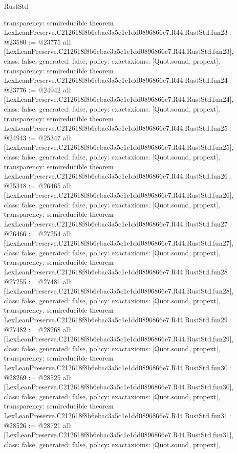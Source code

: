 \begin{lexlean}{RustStd}
\begin{coremodule}
{  transparency: semireducible
}
theorem LexLeanPreserve.C212618f8b6ebac3a5c1e1dd0896866e7.R44.RustStd.fun23 : @23580 := @23775 {
  all: [LexLeanPreserve.C212618f8b6ebac3a5c1e1dd0896866e7.R44.RustStd.fun23],
  class: false,
  generated: false,
  policy: exact{axioms: [Quot.sound, propext]},
  transparency: semireducible
}
theorem LexLeanPreserve.C212618f8b6ebac3a5c1e1dd0896866e7.R44.RustStd.fun24 : @23776 := @24942 {
  all: [LexLeanPreserve.C212618f8b6ebac3a5c1e1dd0896866e7.R44.RustStd.fun24],
  class: false,
  generated: false,
  policy: exact{axioms: [Quot.sound, propext]},
  transparency: semireducible
}
theorem LexLeanPreserve.C212618f8b6ebac3a5c1e1dd0896866e7.R44.RustStd.fun25 : @24943 := @25347 {
  all: [LexLeanPreserve.C212618f8b6ebac3a5c1e1dd0896866e7.R44.RustStd.fun25],
  class: false,
  generated: false,
  policy: exact{axioms: [Quot.sound, propext]},
  transparency: semireducible
}
theorem LexLeanPreserve.C212618f8b6ebac3a5c1e1dd0896866e7.R44.RustStd.fun26 : @25348 := @26465 {
  all: [LexLeanPreserve.C212618f8b6ebac3a5c1e1dd0896866e7.R44.RustStd.fun26],
  class: false,
  generated: false,
  policy: exact{axioms: [Quot.sound, propext]},
  transparency: semireducible
}
theorem LexLeanPreserve.C212618f8b6ebac3a5c1e1dd0896866e7.R44.RustStd.fun27 : @26466 := @27254 {
  all: [LexLeanPreserve.C212618f8b6ebac3a5c1e1dd0896866e7.R44.RustStd.fun27],
  class: false,
  generated: false,
  policy: exact{axioms: [Quot.sound, propext]},
  transparency: semireducible
}
theorem LexLeanPreserve.C212618f8b6ebac3a5c1e1dd0896866e7.R44.RustStd.fun28 : @27255 := @27481 {
  all: [LexLeanPreserve.C212618f8b6ebac3a5c1e1dd0896866e7.R44.RustStd.fun28],
  class: false,
  generated: false,
  policy: exact{axioms: [Quot.sound, propext]},
  transparency: semireducible
}
theorem LexLeanPreserve.C212618f8b6ebac3a5c1e1dd0896866e7.R44.RustStd.fun29 : @27482 := @28268 {
  all: [LexLeanPreserve.C212618f8b6ebac3a5c1e1dd0896866e7.R44.RustStd.fun29],
  class: false,
  generated: false,
  policy: exact{axioms: [Quot.sound, propext]},
  transparency: semireducible
}
theorem LexLeanPreserve.C212618f8b6ebac3a5c1e1dd0896866e7.R44.RustStd.fun30 : @28269 := @28525 {
  all: [LexLeanPreserve.C212618f8b6ebac3a5c1e1dd0896866e7.R44.RustStd.fun30],
  class: false,
  generated: false,
  policy: exact{axioms: [Quot.sound, propext]},
  transparency: semireducible
}
theorem LexLeanPreserve.C212618f8b6ebac3a5c1e1dd0896866e7.R44.RustStd.fun31 : @28526 := @28721 {
  all: [LexLeanPreserve.C212618f8b6ebac3a5c1e1dd0896866e7.R44.RustStd.fun31],
  class: false,
  generated: false,
  policy: exact{axioms: [Quot.sound, propext]},
}
\end{coremodule}
\end{lexlean}
